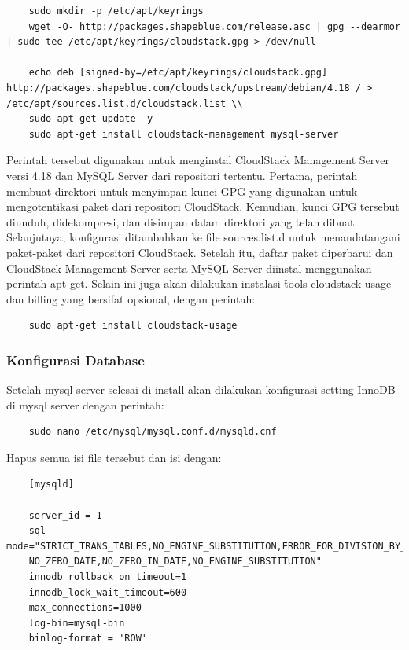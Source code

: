 \begin{lstlisting}
    sudo mkdir -p /etc/apt/keyrings
    wget -O- http://packages.shapeblue.com/release.asc | gpg --dearmor | sudo tee /etc/apt/keyrings/cloudstack.gpg > /dev/null
    
    echo deb [signed-by=/etc/apt/keyrings/cloudstack.gpg] http://packages.shapeblue.com/cloudstack/upstream/debian/4.18 / > /etc/apt/sources.list.d/cloudstack.list \\
    sudo apt-get update -y
    sudo apt-get install cloudstack-management mysql-server
\end{lstlisting}

Perintah tersebut digunakan untuk menginstal CloudStack Management Server versi 4.18 dan MySQL Server dari repositori tertentu. Pertama, perintah membuat direktori untuk menyimpan kunci GPG yang digunakan untuk mengotentikasi paket dari repositori CloudStack. Kemudian, kunci GPG tersebut diunduh, didekompresi, dan disimpan dalam direktori yang telah dibuat. Selanjutnya, konfigurasi ditambahkan ke file sources.list.d untuk menandatangani paket-paket dari repositori CloudStack. Setelah itu, daftar paket diperbarui dan CloudStack Management Server serta MySQL Server diinstal menggunakan perintah apt-get. Selain ini juga akan dilakukan instalasi \f{tools} cloudstack usage dan billing yang bersifat opsional, dengan perintah:

\begin{lstlisting}
    sudo apt-get install cloudstack-usage
\end{lstlisting}

\subsubsection{Konfigurasi Database}
Setelah mysql server selesai di install akan dilakukan konfigurasi setting InnoDB di mysql server dengan perintah:

\begin{lstlisting}
    sudo nano /etc/mysql/mysql.conf.d/mysqld.cnf
\end{lstlisting}

Hapus semua isi file tersebut dan isi dengan:

\begin{listing}[H]
    \begin{verbatim}
    [mysqld]

    server_id = 1
    sql-mode="STRICT_TRANS_TABLES,NO_ENGINE_SUBSTITUTION,ERROR_FOR_DIVISION_BY_ZERO
    NO_ZERO_DATE,NO_ZERO_IN_DATE,NO_ENGINE_SUBSTITUTION"
    innodb_rollback_on_timeout=1
    innodb_lock_wait_timeout=600
    max_connections=1000
    log-bin=mysql-bin
    binlog-format = 'ROW'
    \end{verbatim}
    \caption{Konfigurasi mysqld.cnf}
    \label{code:mysql_config}
\end{listing}

